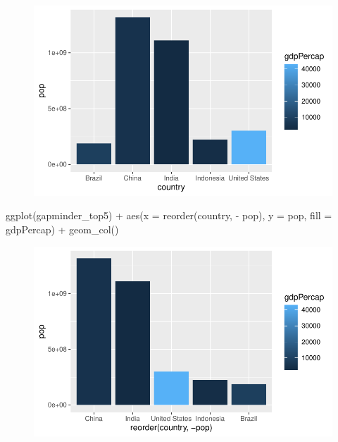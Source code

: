 \documentclass[
  letterpaper,
  DIV=11,
  numbers=noendperiod]{scrartcl}
\newenvironment{Shaded}{\begin{snugshade}}{\end{snugshade}}
\newcommand{\AttributeTok}[1]{\textcolor[rgb]{0.40,0.45,0.13}{#1}}
\newcommand{\FunctionTok}[1]{\textcolor[rgb]{0.28,0.35,0.67}{#1}}
\newcommand{\NormalTok}[1]{\textcolor[rgb]{0.00,0.23,0.31}{#1}}
\newcommand{\SpecialCharTok}[1]{\textcolor[rgb]{0.37,0.37,0.37}{#1}}
\begin{document}
\begin{figure}[H]

{\centering \includegraphics{class05_files/figure-pdf/unnamed-chunk-5-4.pdf}

}

\end{figure}

\begin{Shaded}
\begin{Highlighting}[]
\FunctionTok{ggplot}\NormalTok{(gapminder\_top5) }\SpecialCharTok{+}
  \FunctionTok{aes}\NormalTok{(}\AttributeTok{x =} \FunctionTok{reorder}\NormalTok{(country, }\SpecialCharTok{{-}}\NormalTok{ pop), }\AttributeTok{y =}\NormalTok{ pop, }\AttributeTok{fill =}\NormalTok{ gdpPercap) }\SpecialCharTok{+}
  \FunctionTok{geom\_col}\NormalTok{()}
\end{Highlighting}
\end{Shaded}

\begin{figure}[H]

{\centering \includegraphics{class05_files/figure-pdf/unnamed-chunk-5-5.pdf}

}

\end{figure}
\end{document}
